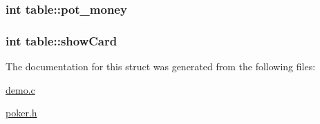 \hypertarget{structtable_a742ffe5b682ef41e0d5284865d6f9707}{
\subsubsection[{pot\+\_\+money}]{\setlength{\rightskip}{0pt plus 5cm}int table\+::pot\+\_\+money}}\label{structtable_a742ffe5b682ef41e0d5284865d6f9707}
\hypertarget{structtable_a1d8bc65b5a26f8b5b7a21a2430432901}{
\subsubsection[{show\+Card}]{\setlength{\rightskip}{0pt plus 5cm}int table\+::show\+Card}}\label{structtable_a1d8bc65b5a26f8b5b7a21a2430432901}


The documentation for this struct was generated from the following files\+:\begin{DoxyCompactItemize}
\item 
\hyperlink{demo_8c}{demo.\+c}\item 
\hyperlink{poker_8h}{poker.\+h}\end{DoxyCompactItemize}
